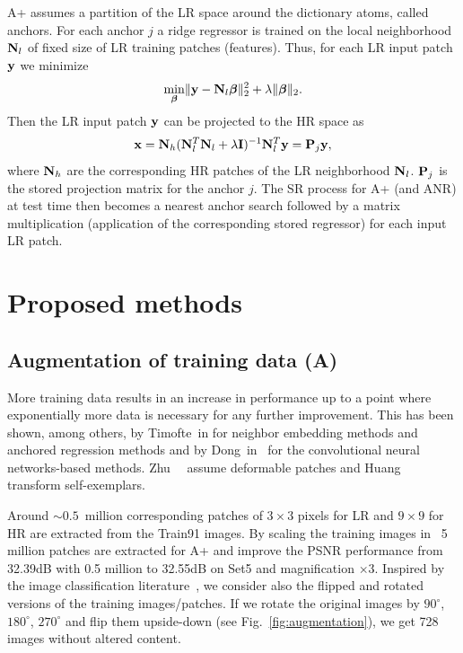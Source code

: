 \documentclass[10pt,twocolumn,letterpaper]{article}
\begin{document}
A+ assumes a partition of the LR space around the dictionary atoms, called anchors.
For each anchor $j$ a ridge regressor is trained on the local neighborhood ${\bf{N}}_l$ of fixed size of LR training patches (features). Thus, for each LR input patch ${\bf{y}}$ we minimize
\begin{equation}
\label{eqn:anr1}
\min_{\boldsymbol{\beta}}\lVert {\bf{y}} - {\bf{N}}_l {\boldsymbol{\beta}}\rVert ^2_2 + \lambda \lVert \boldsymbol{\beta} \rVert _2.
\end{equation}
Then the LR input patch ${\bf{y}}$ can be projected to the HR space as 
\begin{equation}
\label{eqn:anr2}
{\bf x} = {\bf{N}}_h ({\bf{N}}_l^T {\bf{N}}_l + \lambda {\bf{I}})^{-1} {\bf{N}}_l^T{\bf{y}} = {\bf{P}}_j {\bf{y}},
\end{equation}
where ${\bf{N}}_h$ are the corresponding HR patches of the LR neighborhood ${\bf{N}}_l$.  ${\bf{P}}_j$ is the stored projection matrix for the anchor $j$.
The SR process for A+ (and ANR) at test time then becomes a nearest anchor search followed by a matrix multiplication (application of the corresponding stored regressor) for each input LR patch.

\section{Proposed methods}
\label{sec:methods}

\subsection{Augmentation of training data (A)}
\label{ssc:augmentation}
 More training data results in an increase in performance up to a point where exponentially more data is necessary for any further improvement. This has been shown, among others, by Timofte~\etal in \cite{Timofte-ICCV-2013,Timofte-ACCV-2014} for neighbor embedding methods and anchored regression methods and by Dong~\etal in~\cite{Dong-ECCV-2014, Dong-PAMI-2015} for the convolutional neural networks-based methods.
 Zhu~\etal~\cite{Zhu-CVPR-2014} assume deformable patches and Huang~\etal~\cite{Huang-CVPR-2015} transform self-exemplars.

Around $\sim\!0.5$~million corresponding patches of $3\times3$ pixels for LR and $9\times9$ for HR are extracted from the Train91 images. By scaling the training images in~\cite{Timofte-ACCV-2014} 5 million patches are extracted for A+ and improve the PSNR performance from 32.39dB with 0.5 million to 32.55dB on Set5 and magnification $\times3$.
Inspired by the image classification literature~\cite{Chatfield-BMVC-2014}, we consider also the flipped and rotated versions of the training images/patches.
If we rotate the original images by $90^{\circ}$, $180^{\circ}$, $270^{\circ}$ and flip them upside-down (see Fig.~\ref{fig:augmentation}), we get 728 images without altered content.
\end{document}
